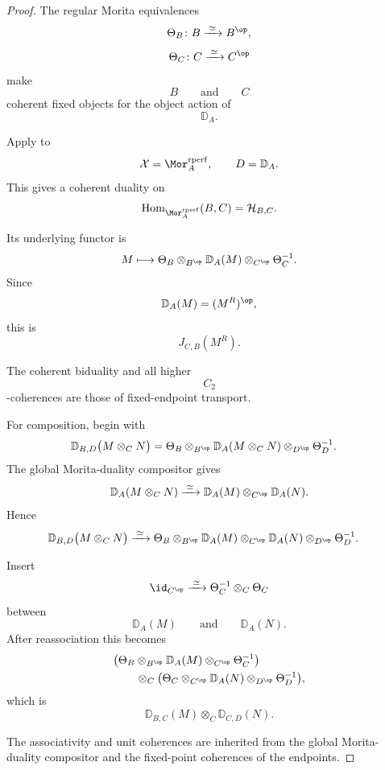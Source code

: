\begin{proof}
The regular Morita equivalences
\[
    \Theta_B
    \colon
    B
    \xrightarrow{\;\simeq\;}
    B^{\op},
\]
\[
    \Theta_C
    \colon
    C
    \xrightarrow{\;\simeq\;}
    C^{\op}
\]
make
\[
    B
    \qquad\text{and}\qquad
    C
\]
coherent fixed objects for the object action of
\[
    \mathbb D_A.
\]

Apply
to
\[
    \mathcal X
    =
    \Mor_A^{\mathrm{rperf}},
    \qquad
    D
    =
    \mathbb D_A.
\]
This gives a coherent duality on
\[
    \operatorname{Hom}_{\Mor_A^{\mathrm{rperf}}}(B,C)
    =
    \mathcal H_{B,C}.
\]

Its underlying functor is
\[
    M
    \longmapsto
    \Theta_B
    \otimes_{B^{\op}}
    \mathbb D_A(M)
    \otimes_{C^{\op}}
    \Theta_C^{-1}.
\]
Since
\[
    \mathbb D_A(M)
    =
    (M^R)^{\op},
\]
this is
\[
    J_{C,B}(M^R).
\]

The coherent biduality and all higher
\[
    C_2
\]
-coherences are those of fixed-endpoint transport.

For composition, begin with
\[
\begin{aligned}
    \mathbb D_{B,D}
    \bigl(
        M\otimes_CN
    \bigr)
    &=
    \Theta_B
    \otimes_{B^{\op}}
    \mathbb D_A(M\otimes_CN)
    \otimes_{D^{\op}}
    \Theta_D^{-1}.
\end{aligned}
\]
The global Morita-duality compositor gives
\[
    \mathbb D_A(M\otimes_CN)
    \xrightarrow{\;\simeq\;}
    \mathbb D_A(M)
    \otimes_{C^{\op}}
    \mathbb D_A(N).
\]
Hence
\[
\begin{aligned}
    \mathbb D_{B,D}
    \bigl(
        M\otimes_CN
    \bigr)
    &\xrightarrow{\;\simeq\;}
    \Theta_B
    \otimes_{B^{\op}}
    \mathbb D_A(M)
    \otimes_{C^{\op}}
    \mathbb D_A(N)
    \otimes_{D^{\op}}
    \Theta_D^{-1}.
\end{aligned}
\]

Insert
\[
    \id_{C^{\op}}
    \xrightarrow{\;\simeq\;}
    \Theta_C^{-1}\otimes_C\Theta_C
\]
between
\[
    \mathbb D_A(M)
    \qquad\text{and}\qquad
    \mathbb D_A(N).
\]
After reassociation this becomes
\[
\begin{aligned}
    &
    \bigl(
        \Theta_B
        \otimes_{B^{\op}}
        \mathbb D_A(M)
        \otimes_{C^{\op}}
        \Theta_C^{-1}
    \bigr)
    \\
    &\qquad\otimes_C
    \bigl(
        \Theta_C
        \otimes_{C^{\op}}
        \mathbb D_A(N)
        \otimes_{D^{\op}}
        \Theta_D^{-1}
    \bigr),
\end{aligned}
\]
which is
\[
    \mathbb D_{B,C}(M)
    \otimes_C
    \mathbb D_{C,D}(N).
\]

The associativity and unit coherences are inherited from the global
Morita-duality compositor and the fixed-point coherences of the
endpoints.
\end{proof}

